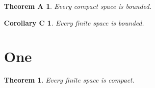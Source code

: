 \documentclass{amsart}
\newtheorem{theorem}{Theorem}[section]
\newtheorem*{thmA}{Theorem A}
\newtheorem*{corC}{Corollary C}
\begin{document}
\begin{thmA} Every compact space is bounded. \end{thmA}
\begin{corC} Every finite space is bounded. \end{corC}
\section{One}
\begin{theorem} Every finite space is compact. \end{theorem}
\end{document}
